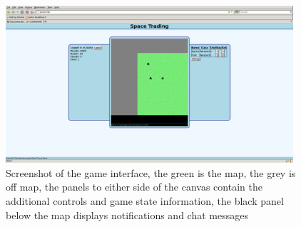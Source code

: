 \documentclass[12pt]{amsart}
\begin{document}
\begin{figure}[h]
\begin{center}
\includegraphics[width = 0.95\textwidth]{screeny}
\caption{Screenshot of the game interface, the green is the map, the grey is off map, the panels to either side of the canvas contain the additional controls and game state information, the black panel below the map displays notifications and chat messages}
\end{center}
\end{figure}
\end{document}
